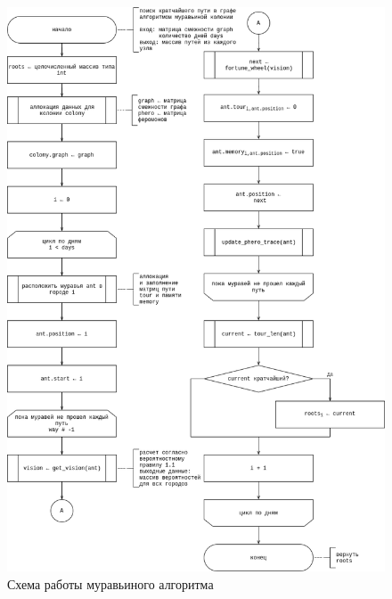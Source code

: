 \begin{center}
    \begin{figure}[!h]
        \centering
        \includegraphics[width=0.85\linewidth]{img/tsp-ant.drawio.png}
        \caption{Схема работы муравьиного алгоритма}
        \label{fig:ant}
    \end{figure}
\end{center}
\newpage


